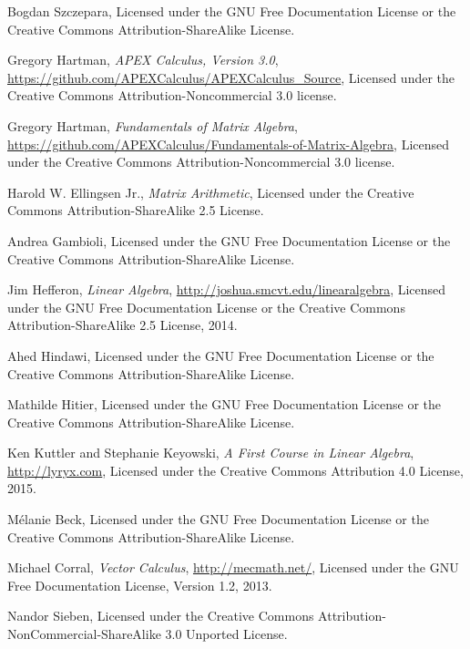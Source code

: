 \onecolumn


\begin{thebibliography}{9}
\label{label:authors}
Bogdan Szczepara,
Licensed under the GNU Free Documentation License or the
Creative Commons Attribution-ShareAlike License.

Gregory Hartman,
\emph{APEX Calculus, Version 3.0},
\url{https://github.com/APEXCalculus/APEXCalculus_Source},
Licensed under the
Creative Commons Attribution-Noncommercial 3.0 license.

Gregory Hartman,
\emph{Fundamentals of Matrix Algebra},
\url{https://github.com/APEXCalculus/Fundamentals-of-Matrix-Algebra},
Licensed under the 
Creative Commons Attribution-Noncommercial 3.0 license.

Harold W. Ellingsen Jr.,
\emph{Matrix Arithmetic},
Licensed under the
Creative Commons Attribution-ShareAlike 2.5 License.

Andrea Gambioli,
Licensed under the GNU Free Documentation License or the
Creative Commons Attribution-ShareAlike License.
 

Jim Hefferon,
\emph{Linear Algebra},
\url{http://joshua.smcvt.edu/linearalgebra},
Licensed under the GNU Free Documentation License or the 
Creative Commons Attribution-ShareAlike 2.5 License,
2014.

Ahed Hindawi,
Licensed under the GNU Free Documentation License or the
Creative Commons Attribution-ShareAlike License.



Mathilde Hitier,
Licensed under the GNU Free Documentation License or the
Creative Commons Attribution-ShareAlike License.


Ken Kuttler and Stephanie Keyowski,
\emph{A First Course in Linear Algebra},
\url{http://lyryx.com},
Licensed under the
Creative Commons Attribution 4.0 License,
2015.

M\'elanie Beck,
Licensed under the GNU Free Documentation License or the
Creative Commons Attribution-ShareAlike License.


Michael Corral,
\emph{Vector Calculus},
\url{http://mecmath.net/},
Licensed under the GNU Free Documentation License, Version 1.2, 2013.

Nandor Sieben,
Licensed under the Creative Commons Attribution-NonCommercial-ShareAlike 3.0 Unported License. 


\end{thebibliography}

